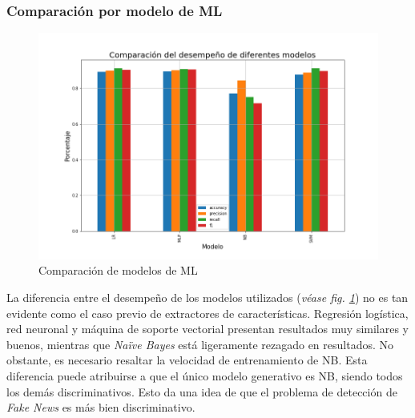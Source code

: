 \subsubsection{Comparación por modelo de ML}
\begin{figure}
    \centering
    \includegraphics[width=\textwidth]{results/FakeNewsDetection/model_comparison.png}
    \caption{Comparación de modelos de ML}
    \label{fig:fake_news_models}
\end{figure}

La diferencia entre el desempeño de los modelos utilizados (\textit{véase fig. \ref{fig:fake_news_models}}) no es tan evidente como el caso previo de extractores de características. Regresión logística, red neuronal y máquina de soporte vectorial presentan resultados muy similares y buenos, mientras que \textit{Naïve Bayes} está ligeramente rezagado en resultados. No obstante, es necesario resaltar la velocidad de entrenamiento de NB. Esta diferencia puede atribuirse a que el único modelo generativo es NB, siendo todos los demás discriminativos. Esto da una idea de que el problema de detección de \textit{Fake News} es más bien discriminativo.

